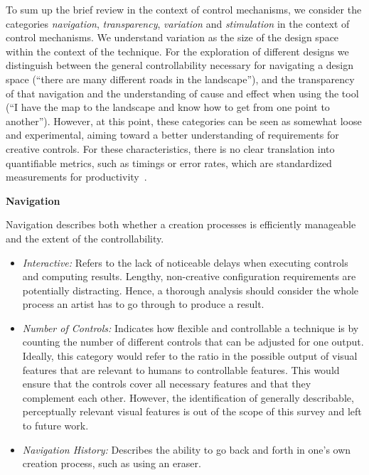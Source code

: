 To sum up the brief review in the context of control mechanisms, we consider the categories \textit{navigation}, \textit{transparency}, \textit{variation} and \textit{stimulation} in the context of control mechanisms. We understand variation as the size of the design space within the context of the technique. For the exploration of different designs we distinguish between the general controllability necessary for navigating a design space (``there are many different roads in the landscape''), and the transparency of that navigation and the understanding of cause and effect when using the tool (``I have the map to the landscape and know how to get from one point to another'').  However, at this point, these categories can be seen as somewhat loose and experimental, aiming toward a better understanding of requirements for creative controls. For these characteristics, there is no clear translation into quantifiable metrics, such as timings or error rates, which are standardized measurements for productivity~\cite{cherry_2014_qcs,shneiderman_2007_cst}.

\noindent\textbf{Navigation}

Navigation describes both whether a creation processes is efficiently manageable and the extent of the controllability.

\begin{itemize}
    \item \textit{Interactive:} Refers to the lack of noticeable delays when executing controls and computing results. Lengthy, non-creative configuration requirements are potentially distracting. Hence, a thorough analysis should consider the whole process an artist has to go through to produce a result.
    \item \textit{Number of Controls:} Indicates how flexible and controllable a technique is by counting the number of different controls that can be adjusted for one output. 
    Ideally, this category would refer to the ratio in the possible output of visual features that are relevant to humans to controllable features. This would ensure that the controls cover all necessary features and that they complement each other. However, the identification of generally describable, perceptually relevant visual features is out of the scope of this survey and left to future work.

    \item \textit{Navigation History:} Describes the ability to go back and forth in one's own creation process, such as using an eraser.
\end{itemize}



